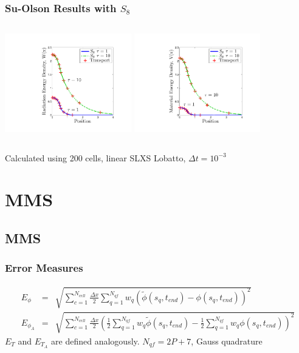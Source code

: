 \documentclass{beamer}
\newcommand{\bea}{\begin{eqnarray*}}  %
\newcommand{\eea}{\end{eqnarray*}}
\begin{document}
\begin{frame}
\frametitle{Su-Olson Results with $S_8$}
\begin{columns}[t]
\centering
\includegraphics[width=5.5cm,trim=1.75in  0.5in 0.75in 0.5in,clip=true]{../chapter6_grey_radtran/Dissertation_Data/Su_Olson_S8_Radiation_Energy.pdf}
\centering
\includegraphics[width=5.5cm,trim=1.75in  0.5in 0.75in 0.5in,clip=true]{../chapter6_grey_radtran/Dissertation_Data/Su_Olson_S8_Material_Energy.pdf}
\end{columns}
Calculated using 200 cells, linear SLXS Lobatto, $\Delta t = 10^{-3}$
\end{frame}

\section{MMS}
\subsection{MMS}

\begin{frame}
\frametitle{Error Measures}
\bea
E_{\phi} &=& \sqrt{\sum_{c=1}^{N_{cell}}{ \frac{\Delta x}{2} \sum_{q=1}^{N_{qf}}{ w_q \left(\widetilde{\phi}(s_q , t_{end}) - \phi(s_q,t_{end})  \right)^2 } } } \\
E_{\phi_A} &=& \sqrt{
\sum_{c=1}^{N_{cell}}{ 
\frac{\Delta x}{2} 
\left( 
\frac{1}{2}\sum_{q=1}^{N_{qf}}{ w_q \widetilde{\phi}(s_q , t_{end})}  - \frac{1}{2}\sum_{q=1}^{N_{qf}}{ w_q \phi(s_q , t_{end})} 
\right)^2 
} 
} 
\eea
\vspace{0.2in}
$E_T$ and $E_{T_A}$ are defined analogously.  $N_{qf} = 2P+ 7$, Gauss quadrature
\end{frame}
\end{document}
